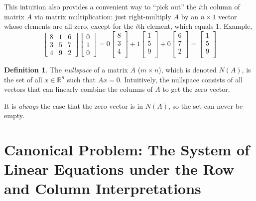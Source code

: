 \documentclass[12pt]{article}
\theoremstyle{plain}
\theoremstyle{definition}
\newtheorem{defn}[thm]{Definition}
\theoremstyle{remark}
\begin{document}
This intuition also provides a convenient way to ``pick out'' the $i$th column of matrix $A$ via matrix multiplication: just right-multiply $A$ by an $n \times 1$ vector whose elements are all zero, except for the $i$th element, which equals 1. Example,
\[
  \begin{bmatrix}
  8 & 1 & 6 \\
  3 & 5 & 7 \\
  4 & 9 & 2
  \end{bmatrix}
  \begin{bmatrix}
  0 \\ 1 \\ 0
  \end{bmatrix}
  = 0
  \begin{bmatrix} 8 \\ 3 \\ 4 \\ \end{bmatrix}
  + 1  \begin{bmatrix} 1 \\ 5 \\ 9 \\ \end{bmatrix}
  + 0  \begin{bmatrix} 6 \\ 7 \\ 2 \\ \end{bmatrix}
  =
  \begin{bmatrix} 1 \\ 5 \\ 9 \\ \end{bmatrix}
\]


\begin{defn}
The \emph{nullspace} of a matrix $A$ ($m\times n$), which is denoted $N(A)$, is the set of all $x \in \mathbb{R}^n$ such that $Ax=0$. Intuitively, the nullspace consists of all vectors that can linearly combine the columns of $A$ to get the zero vector.

It is \emph{always} the case that the zero vector is in $N(A)$, so the set can never be empty.
\end{defn}


\section{Canonical Problem: The System of Linear Equations under the Row and Column Interpretations}
\end{document}

